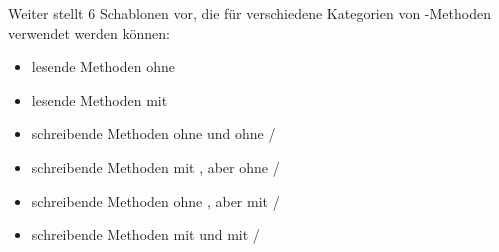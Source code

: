 Weiter stellt \cite{Oec22} 6 Schablonen vor, die für verschiedene Kategorien von -Methoden verwendet werden können:

\begin{itemize}
    \item lesende Methoden ohne 
    \item lesende Methoden mit 
    \item schreibende Methoden ohne  und ohne /
    \item schreibende Methoden mit , aber ohne /
    \item schreibende Methoden ohne , aber mit /
    \item schreibende Methoden mit  und mit /
\end{itemize}










